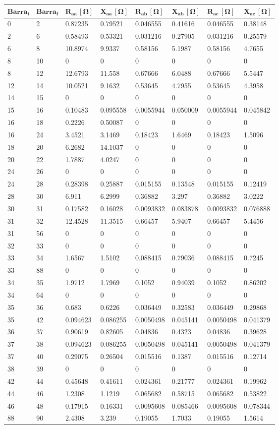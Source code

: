 \begin{tabular}{llllllll}
\toprule
\textbf{$\mathbf{Barra_i}$}&\textbf{$\mathbf{Barra_f}$}&\textbf{$\mathbf{R_{aa}\,[\Omega]}$}&\textbf{$\mathbf{X_{aa}\,[\Omega]}$}&\textbf{$\mathbf{R_{ab}\,[\Omega]}$}&\textbf{$\mathbf{X_{ab}\,[\Omega]}$}&\textbf{$\mathbf{R_{ac}\,[\Omega]}$}&\textbf{$\mathbf{X_{ac}\,[\Omega]}$}\\
\midrule
0&2&0.87235&0.79521&0.046555&0.41616&0.046555&0.38148\\
2&6&0.58493&0.53321&0.031216&0.27905&0.031216&0.25579\\
6&8&10.8974&9.9337&0.58156&5.1987&0.58156&4.7655\\
8&10&0&0&0&0&0&0\\
8&12&12.6793&11.558&0.67666&6.0488&0.67666&5.5447\\
12&14&10.0521&9.1632&0.53645&4.7955&0.53645&4.3958\\
14&15&0&0&0&0&0&0\\
15&16&0.10483&0.095558&0.0055944&0.050009&0.0055944&0.045842\\
16&18&0.2226&0.50087&0&0&0&0\\
16&24&3.4521&3.1469&0.18423&1.6469&0.18423&1.5096\\
18&20&6.2682&14.1037&0&0&0&0\\
20&22&1.7887&4.0247&0&0&0&0\\
24&26&0&0&0&0&0&0\\
24&28&0.28398&0.25887&0.015155&0.13548&0.015155&0.12419\\
28&30&6.911&6.2999&0.36882&3.297&0.36882&3.0222\\
30&31&0.17582&0.16028&0.0093832&0.083878&0.0093832&0.076888\\
31&32&12.4528&11.3515&0.66457&5.9407&0.66457&5.4456\\
31&56&0&0&0&0&0&0\\
32&33&0&0&0&0&0&0\\
33&34&1.6567&1.5102&0.088415&0.79036&0.088415&0.7245\\
33&88&0&0&0&0&0&0\\
34&35&1.9712&1.7969&0.1052&0.94039&0.1052&0.86202\\
34&64&0&0&0&0&0&0\\
35&36&0.683&0.6226&0.036449&0.32583&0.036449&0.29868\\
35&42&0.094623&0.086255&0.0050498&0.045141&0.0050498&0.041379\\
36&37&0.90619&0.82605&0.04836&0.4323&0.04836&0.39628\\
37&38&0.094623&0.086255&0.0050498&0.045141&0.0050498&0.041379\\
37&40&0.29075&0.26504&0.015516&0.1387&0.015516&0.12714\\
38&39&0&0&0&0&0&0\\
42&44&0.45648&0.41611&0.024361&0.21777&0.024361&0.19962\\
44&46&1.2308&1.1219&0.065682&0.58715&0.065682&0.53822\\
46&48&0.17915&0.16331&0.0095608&0.085466&0.0095608&0.078344\\
88&90&2.4308&3.239&0.19055&1.7033&0.19055&1.5614\\
\bottomrule
\end{tabular}
